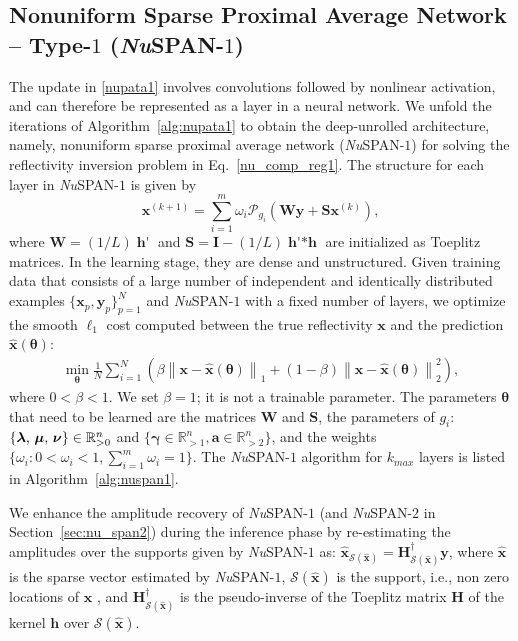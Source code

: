 \documentclass[journal]{IEEEtran}
\begin{document}
\subsection{Nonuniform Sparse Proximal Average Network -- Type-\texorpdfstring{$1$}{1} ({\it Nu}SPAN-\texorpdfstring{$1$}{1})}
\label{subsec:nu_span1}%
The update in \eqref{nupata1} involves convolutions followed by nonlinear activation, and can therefore be represented as a layer in a neural network. We unfold the iterations of Algorithm~\ref{alg:nupata1} to obtain the deep-unrolled architecture, namely, nonuniform sparse proximal average network ({\it Nu}SPAN-$1$) for solving the reflectivity inversion problem in Eq.~\eqref{nu_comp_reg1}. The structure for each layer in {\it Nu}SPAN-$1$ is given by
\begin{equation}
    \boldsymbol{x}^{(k+1)} = \sum_{i = 1}^m \omega_{i} \mathcal{P}_{g_{i}} ( \mathbf{W} \boldsymbol{y} + \mathbf{S} \boldsymbol{x}^{(k)}),
\end{equation}
where \( \mathbf{W}=(1/L)\mathop{\boldsymbol{h}'} \) and \( \mathbf{S}=\mathbf{I}-(1/L)\mathop{\boldsymbol{h}' * \boldsymbol{h}} \) \cite{gregor2010learning} are initialized as Toeplitz matrices. In the learning stage, they are dense and unstructured. Given training data that consists of a large number of independent and identically distributed examples $\{\boldsymbol{x}_p, \boldsymbol{y}_p\}_{p=1}^{N}$ and {\it Nu}SPAN-$1$ with a fixed number of layers, we optimize the smooth $\ell_1$ cost computed between the true reflectivity $\boldsymbol{x}$ and the prediction $\hat{\boldsymbol{x}}(\boldsymbol{\theta})$:
\begin{align*}
    \min_{\boldsymbol{\theta}}\frac{1}{N}\sum\limits_{i=1}^N \left(\beta \left\|{\boldsymbol{x} - \hat{\boldsymbol{x}}(\boldsymbol{\theta})} \right\|_{1} + (1-\beta) \left\|{\boldsymbol{x} - \hat{\boldsymbol{x}}(\boldsymbol{\theta})} \right\|_{2}^{2}\right),
\end{align*}
where $0 < \beta < 1$. We set $\beta = 1$; it is not a trainable parameter. The parameters $\boldsymbol{\theta}$ that need to be learned are the matrices $\mathbf{W}$ and $\mathbf{S}$, the parameters of $g_{i}$: $\{\boldsymbol{\lambda$, $\mu$, $\nu}\} \in \mathbb{R}^n_{>0}$ and $\{\boldsymbol{\gamma}\in \mathbb{R}^n_{>1}, \boldsymbol{a} \in \mathbb{R}^n_{>2} \}$, and the weights $\{\omega_{i}: 0 < \omega_{i} < 1, \sum_{i=1}^m \omega_{i} = 1\}$. The {\it Nu}SPAN-$1$ algorithm for $k_{max}$ layers is listed in Algorithm~\ref{alg:nuspan1}.%

We enhance the amplitude recovery of {\it Nu}SPAN-$1$ (and {\it Nu}SPAN-$2$ in Section~\ref{sec:nu_span2}) during the inference phase by re-estimating the amplitudes over the supports given by {\it Nu}SPAN-$1$ as: $\hat{\boldsymbol{x}}_{\mathcal{S}(\hat{\boldsymbol{x}})} = \mathbf{H}_{\mathcal{S}(\hat{\boldsymbol{x}})}^{\dagger}\boldsymbol{y}$, where $\hat{\boldsymbol{x}}$ is the sparse vector estimated by {\it Nu}SPAN-$1$, $\mathcal{S}(\hat{\boldsymbol{x}})$ is the support, i.e., non zero locations of $\hat{\boldsymbol{x}}$ , and $\mathbf{H}_{\mathcal{S}(\hat{\boldsymbol{x}})}^{\dagger}$ is the pseudo-inverse of the Toeplitz matrix $\mathbf{H}$ of the kernel $\boldsymbol{h}$ over $\mathcal{S}(\hat{\boldsymbol{x}})$.
\end{document}
